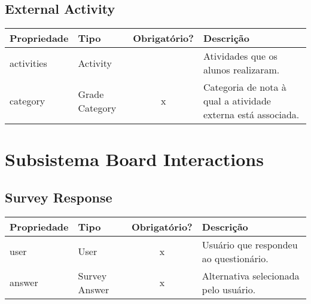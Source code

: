 \subsection{External Activity} \label{External Activity}
\begin{table}[H]
	\footnotesize
	\begin{tabularx}{\textwidth}{|X|X|c|p{7.8cm}|}   \hline \rowcolor[rgb]{0.8,0.8,0.8}
		
		\textbf{Propriedade} & \textbf{Tipo} & \textbf{Obrigatório?} & \centerline{\textbf{Descrição}} \\\hline  	
		
		activities & Activity & {} & Atividades que os alunos realizaram. \\\hline
		category & Grade Category & x & Categoria de nota à qual a atividade externa está associada.\\\hline			
		
	\end{tabularx}	
\end{table}


\newpage

\section{Subsistema Board Interactions}

\subsection{Survey Response} \label{Survey Response}
\begin{table}[H]
	\footnotesize
	\begin{tabularx}{\textwidth}{|X|X|c|p{7.8cm}|}   \hline \rowcolor[rgb]{0.8,0.8,0.8}
		
		\textbf{Propriedade} & \textbf{Tipo} & \textbf{Obrigatório?} & \centerline{\textbf{Descrição}} \\\hline  	
		
		user & User & x & Usuário que respondeu ao questionário. \\\hline
		answer & Survey Answer & x & Alternativa selecionada pelo usuário. \\\hline		
		
	\end{tabularx}	
\end{table}

